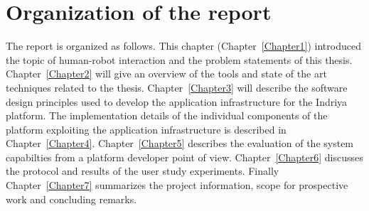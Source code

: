 \section{Organization of the report}
\label{sec:organization}
The report is organized as follows. This chapter (Chapter~\ref{Chapter1}) introduced the topic of human-robot interaction and the problem statements of this thesis. Chapter~\ref{Chapter2} will give an overview of the tools and state of the art techniques related to the thesis. Chapter~\ref{Chapter3} will describe the software design principles used to develop the application infrastructure for the Indriya platform. The implementation details of the individual components of the platform exploiting the application infrastructure is described in Chapter~\ref{Chapter4}. Chapter~\ref{Chapter5} describes the evaluation of the system capabilties from a platform developer point of view. Chapter~\ref{Chapter6} discusses the protocol and results of the user study experiments. Finally Chapter~\ref{Chapter7} summarizes the project information, scope for prospective work and concluding remarks.